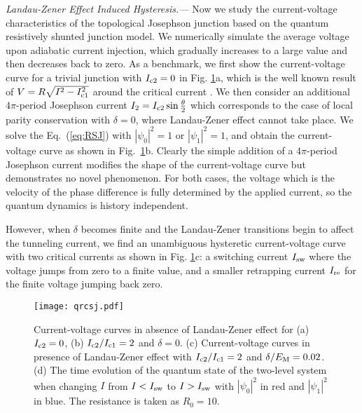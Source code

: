 \documentclass[aps,prl,twocolumn,showpacs,showpacs,10pt,superscriptaddress]{revtex4-1}
\begin{document}
{\it Landau-Zener Effect Induced Hysteresis.---}
Now we study the current-voltage characteristics of the topological Josephson junction based on the quantum resistively shunted junction model. We numerically simulate the average voltage upon adiabatic current injection, which gradually increases to a large value and then decreases back to zero.
As a benchmark, we first show the current-voltage curve for a trivial junction with $I_{\rm c2} = 0$ in Fig. \ref{fig:qrcsj}a, which is the well known result of $V= R \sqrt{ I^2 - I^2_{\rm c1}}$ around the critical current \cite{tinkhambook}. We then consider an additional $4\pi$-period Josephson current $I_2=I_{\rm c2}\sin \frac{\theta}{2}$ which corresponds to the case of local parity conservation with $\delta = 0$, where Landau-Zener effect cannot take place. We solve the Eq.~(\ref{eq:RSJ}) with $|\psi_0|^2=1$ or $|\psi_1|^2=1$, and obtain the current-voltage curve as shown in Fig.~\ref{fig:qrcsj}b. Clearly the simple addition of a $4\pi$-period Josephson current modifies the shape of the current-voltage curve but demonstrates no novel phenomenon. For both cases, the voltage which is the velocity of the phase difference is fully determined by the applied current, so the quantum dynamics is history independent. 

However, when $\delta$ becomes finite and the Landau-Zener transitions begin to affect the tunneling current, we find an unambiguous hysteretic current-voltage curve with two critical currents as shown in Fig. \ref{fig:qrcsj}c: a switching current $I_{\rm sw}$ where the voltage jumps from zero to a finite value, and a smaller retrapping current $I_{\rm re}$ for the finite voltage jumping back zero.


\begin{figure}[t]
\begin{center}
\texttt{[image: qrcsj.pdf]}
\caption{Current-voltage curves in absence of Landau-Zener effect for (a) $I_{\rm c2} = 0$, (b) $I_{\rm c2}/I_{\rm c1} = 2$ and $\delta=0$. (c) Current-voltage curves in presence of Landau-Zener effect with $I_{\rm c2}/I_{\rm c1} = 2$ and $\delta/E_{\rm M} = 0.02$. (d) The time evolution of the quantum state of the two-level system when changing $I$ from $I<I_{\rm sw}$ to $I>I_{\rm sw}$ with $|\psi_0|^2$ in red and $|\psi_1|^2$ in blue. The resistance is taken as $R_0 = 10$.}
\label{fig:qrcsj}
\end{center}
\end{figure}
\end{document}
